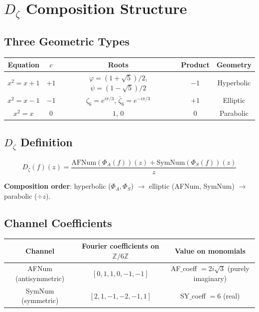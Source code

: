 \appendix

\chapter{\texorpdfstring{$D_\zeta$}{Dζ} Composition Structure}
\label{app:dzeta_composition}

\section{Three Geometric Types}

\begin{center}
\begin{tabular}{|c|c|c|c|c|}
\hline
Equation & $c$ & Roots & Product & Geometry \\
\hline
$x^2 = x + 1$ & $+1$ & $\varphi = (1+\sqrt{5})/2$, $\psi = (1-\sqrt{5})/2$ & $-1$ & Hyperbolic \\
$x^2 = x - 1$ & $-1$ & $\zeta_6 = e^{i\pi/3}$, $\bar{\zeta}_6 = e^{-i\pi/3}$ & $+1$ & Elliptic \\
$x^2 = x$ & $0$ & $1$, $0$ & $0$ & Parabolic \\
\hline
\end{tabular}
\end{center}

\section{\texorpdfstring{$D_\zeta$}{Dζ} Definition}

\[
D_\zeta(f)(z) = \frac{\mathrm{AFNum}(\Phi_A(f))(z) + \mathrm{SymNum}(\Phi_S(f))(z)}{z}
\]

\textbf{Composition order}: hyperbolic ($\Phi_A, \Phi_S$) $\to$ elliptic (AFNum, SymNum) $\to$ parabolic ($\div z$).

\section{Channel Coefficients}

\begin{center}
\begin{tabular}{|c|c|c|}
\hline
Channel & Fourier coefficients on $\mathbb{Z}/6\mathbb{Z}$ & Value on monomials \\
\hline
AFNum (antisymmetric) & $[0, 1, 1, 0, -1, -1]$ & AF$\_$coeff $= 2i\sqrt{3}$ (purely imaginary) \\
SymNum (symmetric) & $[2, 1, -1, -2, -1, 1]$ & SY$\_$coeff $= 6$ (real) \\
\hline
\end{tabular}
\end{center}

